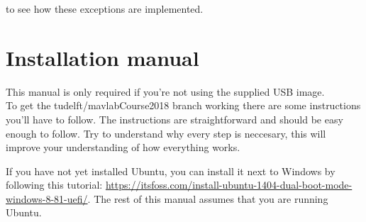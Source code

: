 \documentclass{article}
\begin{document}
 to see how these exceptions are implemented. 

\clearpage
\section*{Installation manual}

This manual is only required if you're not using the supplied USB image.\\

\noindent To get the tudelft/mavlabCourse2018 branch working there are some instructions you'll have to follow. The instructions are straightforward and should be easy enough to follow. Try to understand why every step is neccesary, this will improve your understanding of how everything works.

\medskip
If you have not yet installed Ubuntu, you can install it next to Windows by following this tutorial: \url{https://itsfoss.com/install-ubuntu-1404-dual-boot-mode-windows-8-81-uefi/}. The rest of this manual assumes that you are running Ubuntu.
\end{document}
